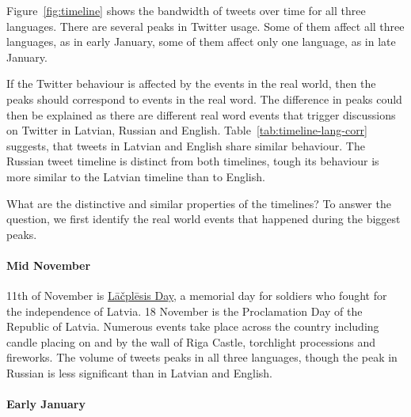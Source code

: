 \documentclass[11pt,a4paper]{article}
\begin{document}


Figure~\ref{fig:timeline} shows the bandwidth of tweets over time for all three languages. There are several peaks in Twitter usage. Some of them affect all three languages, as in early January, some of them affect only one language, as in late January. %

If the Twitter behaviour is affected by the events in the real world, then the peaks should correspond to events in the real word. The difference in peaks could then be explained as there are different real word events that trigger discussions on Twitter in Latvian, Russian and English. Table~\ref{tab:timeline-lang-corr} suggests, that tweets in Latvian and English share similar behaviour. The Russian tweet timeline is distinct from both timelines, tough its behaviour is more similar to the Latvian timeline than to English.



What are the distinctive and similar properties of the timelines? To answer the question, we first identify the real world events that happened during the biggest peaks.

\paragraph{Mid November}

11th of November is \href{https://en.wikipedia.org/wiki/L\%C4\%81\%C4\%8Dpl\%C4\%93sis_Day}{L\={a}\v{c}pl\={e}sis Day}, a memorial day for soldiers who fought for the independence of Latvia. 18 November is the Proclamation Day of the Republic of Latvia. Numerous events take place across the country including candle placing on and by the wall of Riga Castle, torchlight processions and fireworks. The volume of tweets peaks in all three languages, though the peak in Russian is less significant than in Latvian and English.



\paragraph{Early January}
\end{document}

